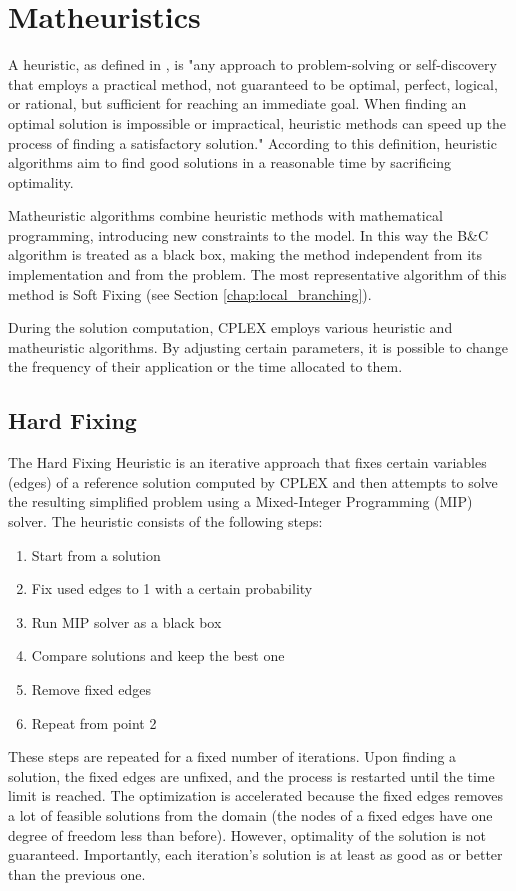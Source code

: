 \chapter{Matheuristics}

A heuristic, as defined in \cite{wiki:Heuristic}, is "any approach to problem-solving or self-discovery that employs a practical method, not guaranteed to be optimal, perfect, logical, or rational, but sufficient for reaching an immediate goal. When finding an optimal solution is impossible or impractical, heuristic methods can speed up the process of finding a satisfactory solution." According to this definition, heuristic algorithms aim to find good solutions in a reasonable time by sacrificing optimality.

Matheuristic algorithms combine heuristic methods with mathematical programming, introducing new constraints to the model. In this way the B\&C algorithm is treated as a black box, making the method independent from its implementation and from the problem. The most representative algorithm of this method is Soft Fixing (see Section \ref{chap:local_branching}).

During the solution computation, CPLEX employs various heuristic and matheuristic algorithms. By adjusting certain parameters, it is possible to change the frequency of their application or the time allocated to them.


\section{Hard Fixing}
The Hard Fixing Heuristic is an iterative approach that fixes certain variables (edges) of a reference solution computed by CPLEX and then attempts to solve the resulting simplified problem using a Mixed-Integer Programming (MIP) solver. The heuristic consists of the following steps:

\begin{enumerate}
    \item Start from a solution
    \item Fix used edges to 1 with a certain probability
    \item Run MIP solver as a black box
    \item Compare solutions and keep the best one
    \item Remove fixed edges
    \item Repeat from point 2
\end{enumerate}

These steps are repeated for a fixed number of iterations. Upon finding a solution, the fixed edges are unfixed, and the process is restarted until the time limit is reached. The optimization is accelerated because the fixed edges removes a lot of feasible solutions from the domain (the nodes of a fixed edges have one degree of freedom less than before). However, optimality of the solution is not guaranteed. Importantly, each iteration's solution is at least as good as or better than the previous one.

